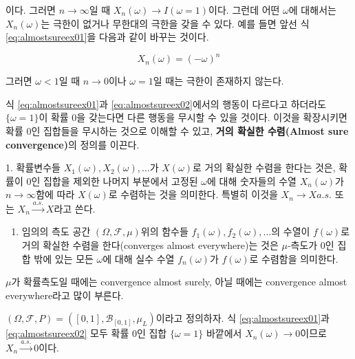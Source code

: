 \documentclass[b5paper,]{scrbook}
\providecommand{\tightlist}{%
  \setlength{\itemsep}{0pt}\setlength{\parskip}{0pt}}
\theoremstyle{plain}
\theoremstyle{definition}
\numberwithin{equation}{section}
\let\BeginKnitrBlock\begin \let\EndKnitrBlock\end
\begin{document}
이다. 그러면 \(n\rightarrow \infty\)일 때 \(X_{n}(\omega) \rightarrow I(\omega=1)\)이다. 그런데 어떤 \(\omega\)에 대해서는 \(X_{n}(\omega)\)는 극한이 없거나 무한대의 극한을 갖을 수 있다. 예를 들면 앞선 식 \eqref{eq:almostsureex01}을 다음과 같이 바꾸는 것이다.

\begin{equation}
X_{n}(\omega)=(-\omega)^{n}
\label{eq:almostsureex02}
\end{equation}

그러면 \(\omega < 1\)일 때 \(n\rightarrow 0\)이나 \(\omega=1\)일 때는 극한이 존재하지 않는다.

식 \eqref{eq:almostsureex01}과 \eqref{eq:almostsureex02}에서의 행동이 다르다고 하더라도 \(\{\omega=1\}\)이 확률 0을 갖는다면 다른 행동을 무시할 수 있을 것이다. 이것을 확장시키면 확률 0인 집합들을 무시하는 것으로 이해할 수 있고, \textbf{거의 확실한 수렴(Almost sure convergence)}의 정의를 이끈다.

\BeginKnitrBlock{definition}[거의 확실한 수렴]
\protect\hypertarget{def:unnamed-chunk-112}{}{\label{def:unnamed-chunk-112} {} }
1. 확률변수들 \(X_{1}(\omega), X_{2}(\omega), \ldots\)가 \(X(\omega)\)로 거의 확실한 수렴을 한다는 것은, 확률이 0인 집합을 제외한 나머지 부분에서 고정된 \(\omega\)에 대해 숫자들의 수열 \(X_{n}(\omega)\)가 \(n\rightarrow\infty\)함에 따라 \(X(\omega)\)로 수렴하는 것을 의미한다. 특별히 이것을 \(X_{n}\rightarrow X a.s.\) 또는 \(X_{n}\stackrel{a.s.}{\rightarrow}X\)라고 쓴다.

\begin{enumerate}
\def\labelenumi{\arabic{enumi}.}
\setcounter{enumi}{1}
\tightlist
\item
  임의의 측도 공간 \((\Omega, \mathcal{F}, \mu)\)위의 함수들 \(f_{1}(\omega), f_{2}(\omega),\ldots\)의 수열이 \(f(\omega)\)로 거의 확실한 수렴을 한다(converges almost everywhere)는 것은 \(\mu\)-측도가 0인 집합 밖에 있는 모든 \(\omega\)에 대해 실수 수열 \(f_{n}(\omega)\)가 \(f(\omega)\)로 수렴함을 의미한다.
\end{enumerate}
\EndKnitrBlock{definition}

\(\mu\)가 확률측도일 때에는 convergence almost surely, 아닐 때에는 convergence almost everywhere라고 많이 부른다.

\BeginKnitrBlock{example}[앞선 예의 거의 확실한 수렴]
\protect\hypertarget{exm:unnamed-chunk-113}{}{\label{exm:unnamed-chunk-113} {} }\((\Omega, \mathcal{F}, P)=([0,1], \mathcal{B}_{[0,1]}, \mu_{L})\)이라고 정의하자. 식 \eqref{eq:almostsureex01}과 \eqref{eq:almostsureex02} 모두 확률 0인 집합 \(\{\omega = 1\}\) 바깥에서 \(X_{n}(\omega) \rightarrow 0\)이므로 \(X_{n}\stackrel{a.s.}{\rightarrow}0\)이다.
\EndKnitrBlock{example}
\end{document}
